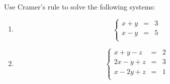 \begin{Pb}
Use Cramer's rule to solve the following systems:
\begin{enumerate}
\item 
\[\left\{\begin{array}{ccc}
x+y  & = & 3 \\
x-y  & = & 5 \\
\end{array}\right.\]
\item 
\[\left\{\begin{array}{ccc}
x+y-z & = & 2 \\
2x -y +z & = & 3 \\
x-2y+z & = & 1 \\
\end{array}\right.\]
\end{enumerate}
\end{Pb}
